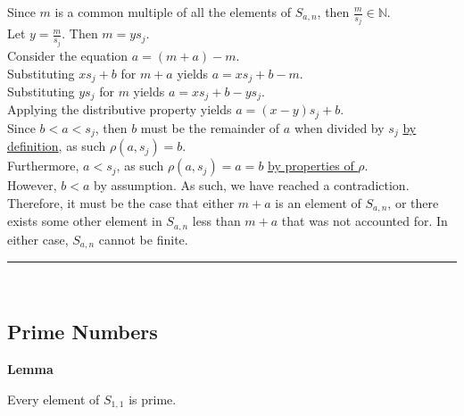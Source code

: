 \documentclass[a4paper,12pt]{article}
\begin{document}
\noindent Since $m$ is a common multiple of all the elements of $S_{a,n}$, then $\frac{m}{s_j} \in \mathbb{N}$.\\

\noindent Let $y = \frac{m}{s_j}$. Then $m = ys_j$.\\

\noindent Consider the equation $a = (m + a) - m$.\\

\noindent Substituting $xs_j + b$ for $m + a$ yields $a = xs_j + b - m$.\\

\noindent Substituting $ys_j$ for $m$ yields $a = xs_j + b - ys_j$.\\

\noindent Applying the distributive property yields $a = (x - y)s_j + b$.\\

\noindent Since $b < a < s_j$, then $b$ must be the remainder of $a$ when divided by $s_j$ \hyperlink{theorem:remainder_theorem}{by definition}, as such $\rho(a, s_j) = b$.\\

\noindent Furthermore, $a < s_j$, as such $\rho(a, s_j) = a = b$ \hyperlink{remainder_properties}{by properties of $\rho$}.\\

\noindent However, $b < a$ by assumption. As such, we have reached a contradiction.\\

\noindent Therefore, it must be the case that either $m + a$ is an element of $S_{a,n}$, or there exists some other element in $S_{a,n}$ less than $m + a$ that was not accounted for. In either case, $S_{a,n}$ cannot be finite.


\begin{center}
\noindent\rule{8cm}{0.4pt}
\end{center}
\noindent \\






\subsection{Prime Numbers}

\label{lemma:asn_subset_prime}
\hypertarget{lemma:asn_subset_prime}{}
\begin{tcolorbox}
\textbf{Lemma}

Every element of $S_{1, 1}$ is prime. 
\end{tcolorbox}
\end{document}
